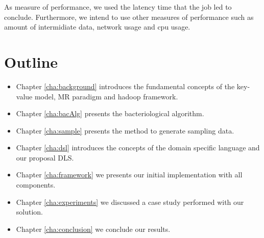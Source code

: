 As measure of performance, we used the latency time that the job led to conclude.
Furthermore, we intend to use other measures of performance such as amount of intermidiate data,
network usage and cpu usage.

\section{Outline}

\begin{itemize}
	\item Chapter \ref{cha:background} introduces the fundamental concepts of the
	key-value model, MR paradigm and hadoop framework.
    \item Chapter \ref{cha:bacAlg} presents the bacteriological algorithm.
    \item Chapter \ref{cha:sample} presents the method to generate sampling
    data.
    \item Chapter \ref{cha:dsl} introduces the concepts of the domain specific language
	and our proposal DLS.
	\item Chapter \ref{cha:framework} we presents our initial implementation with all components.
    \item Chapter \ref{cha:experiments} we discussed a case study performed with our solution.
	\item Chapter \ref{cha:conclusion} we conclude our results.
\end{itemize}




